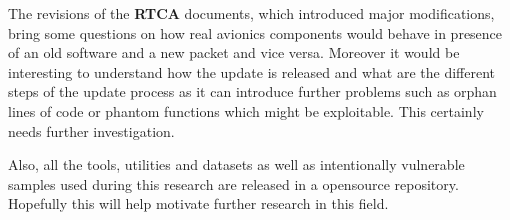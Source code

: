 \documentclass[../main.tex]{subfiles}
\begin{document}
The revisions of the \textbf{RTCA} documents, which introduced major modifications, bring some questions on how real avionics components would behave in presence of an old software and a new packet and vice versa. Moreover it would be interesting to understand how the update is released and what are the different steps of the update process as it can introduce further problems such as orphan lines of code or phantom functions which might be exploitable. This certainly needs further investigation.

Also, all the tools, utilities and datasets as well as intentionally vulnerable samples used during this research are released in a opensource repository.
Hopefully this will help motivate further research in this field.
\end{document}
